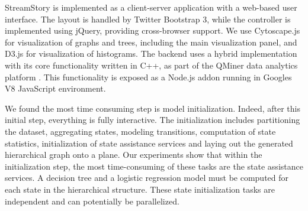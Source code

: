 StreamStory is implemented as a client-server application with a web-based user interface. %
The layout is handled by Twitter Bootstrap 3, %
while the controller is implemented using jQuery, providing cross-browser support. We use Cytoscape.js for visualization of graphs and trees, including the main visualization panel, and D3.js for visualization of histograms. %
%
The backend uses a hybrid implementation with its core functionality written in C++, as part of the QMiner data analytics platform \cite{qminer}. This functionality is exposed as a Node.js addon running in Googles V8 JavaScript environment. 

We found the most time consuming step
is model initialization. Indeed, after this initial step, everything is fully interactive.
The initialization includes partitioning the dataset, aggregating states, modeling transitions,
computation of state statistics, initialization of state assistance services and laying out the generated
hierarchical graph onto a plane. Our experiments show that within the initialization step, the most time-consuming of these tasks are the state assistance services. A decision tree and a logistic regression
model must be computed for each state in the hierarchical structure. These state initialization tasks
are independent and can potentially be parallelized.


